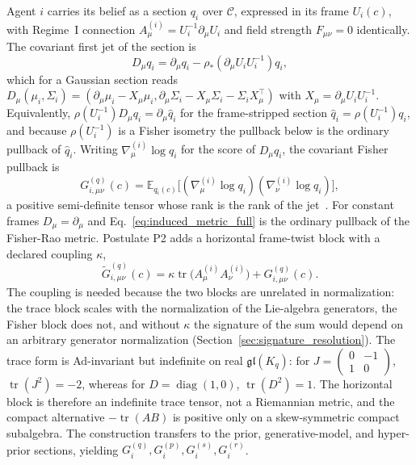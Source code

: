 Agent $i$ carries its belief as a section $q_i$ over $\mathcal{C}$, expressed in its frame $U_i(c)$, with Regime~I connection $A^{(i)}_\mu = U_i^{-1}\partial_\mu U_i$ and field strength $F_{\mu\nu} = 0$ identically. The covariant first jet of the section is
\begin{equation}
D_\mu q_i = \partial_\mu q_i - \rho_*\left(\partial_\mu U_i U_i^{-1}\right) q_i ,
\label{eq:covariant_jet}
\end{equation}
which for a Gaussian section reads $D_\mu(\mu_i, \Sigma_i) = (\partial_\mu\mu_i - X_\mu\mu_i, \partial_\mu\Sigma_i - X_\mu\Sigma_i - \Sigma_i X_\mu^\top)$ with $X_\mu = \partial_\mu U_i U_i^{-1}$. Equivalently, $\rho(U_i^{-1})D_\mu q_i = \partial_\mu \hat{q}_i$ for the frame-stripped section $\hat{q}_i = \rho(U_i^{-1})q_i$, and because $\rho(U_i^{-1})$ is a Fisher isometry the pullback below is the ordinary pullback of $\hat{q}_i$. Writing $\nabla^{(i)}_\mu \log q_i$ for the score of $D_\mu q_i$, the covariant Fisher pullback is
\begin{equation}
\boxed{G^{(q)}_{i,\mu\nu}(c) = \mathbb{E}_{q_i(c)}\big[(\nabla^{(i)}_\mu \log q_i)(\nabla^{(i)}_\nu \log q_i)\big],}
\label{eq:induced_metric_full}
\end{equation}
a positive semi-definite tensor whose rank is the rank of the jet~\cite[Ch.~B2]{DennisGaugeVFESuppB2026}. For constant frames $D_\mu = \partial_\mu$ and Eq.~\eqref{eq:induced_metric_full} is the ordinary pullback of the Fisher-Rao metric. Postulate P2 adds a horizontal frame-twist block with a declared coupling $\kappa$,
\begin{equation}
\widetilde{G}^{(q)}_{i,\mu\nu}(c) = \kappa\operatorname{tr}\big(A^{(i)}_\mu A^{(i)}_\nu\big) + G^{(q)}_{i,\mu\nu}(c).
\label{eq:combined_tensor}
\end{equation}
The coupling is needed because the two blocks are unrelated in normalization: the trace block scales with the normalization of the Lie-algebra generators, the Fisher block does not, and without $\kappa$ the signature of the sum would depend on an arbitrary generator normalization (Section~\ref{sec:signature_resolution}). The trace form is Ad-invariant but indefinite on real $\mathfrak{gl}(K_q)$: for $J=\left(\begin{smallmatrix}0&-1\\1&0\end{smallmatrix}\right)$, $\operatorname{tr}(J^2)=-2$, whereas for $D=\operatorname{diag}(1,0)$, $\operatorname{tr}(D^2)=1$. The horizontal block is therefore an indefinite trace tensor, not a Riemannian metric, and the compact alternative $-\operatorname{tr}(AB)$ is positive only on a skew-symmetric compact subalgebra. The construction transfers to the prior, generative-model, and hyper-prior sections, yielding $G_i^{(q)}, G_i^{(p)}, G_i^{(s)}, G_i^{(r)}$.

